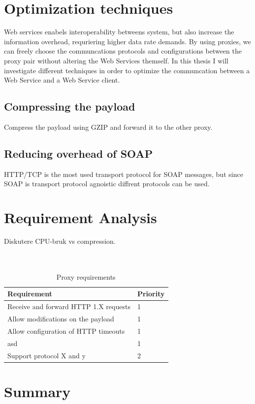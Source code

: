 \documentclass[USenglish]{article}
\begin{document}
\section{Optimization techniques}
Web services enabels interoperability betweens system, but also increase the information overhead, requriering higher data rate demands.
By using proxies, we can freely choose the communcations protocols and
configurations between the proxy pair without altering the Web Services themself.
In this thesis I will investigate different techniques in order to optimize the
communcation between a Web Service and a Web Service client.

\subsection{Compressing the payload}
Compress the payload using GZIP and forward it to the other proxy.

\subsection{Reducing overhead of SOAP}
HTTP/TCP is the most used transport protocol for SOAP messages, but since SOAP is transport protocol agnoistic diffrent protocols can be used.


\section{Requirement Analysis}
Diskutere CPU-bruk vs compression.
\\ \\ \\
\begin{table}
\begin{tabular}{| l | l |}
\hline
  \textbf{Requirement} & \textbf{Priority} \\ \hline
  Receive and forward HTTP 1.X requests & 1\\ \hline
  Allow modifications on the payload & 1 \\ \hline
  Allow configuration of HTTP timeouts & 1 \\ \hline
  asd & 1 \\ \hline
  Support protocol X and y & 2 \\ \hline
\end{tabular}
\caption{Proxy requirements}
\end{table}

\section{Summary}
\end{document}
